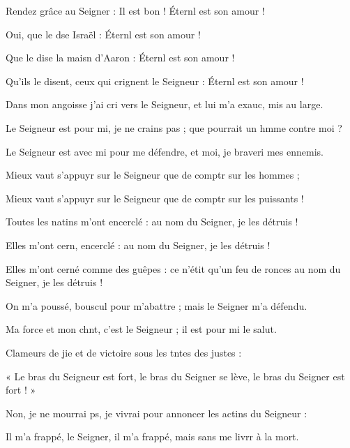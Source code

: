 \item Rendez grâce au Seigner : Il est bon !\psstar{} Éternl est son amour !
\item Oui, que le dse Israël :\psstar{} Éternl est son amour !
\item Que le dise la maisn d’Aaron :\psstar{} Éternl est son amour !
\item Qu’ils le disent, ceux qui crignent le Seigneur :\psstar{} Éternl est son amour !
\item Dans mon angoisse j’ai cri vers le Seigneur,\psstar{} et lui m’a exauc, mis au large.
\item Le Seigneur est pour mi, je ne crains pas ;\psstar{} que pourrait un hmme contre moi ?
\item Le Seigneur est avec mi pour me défendre,\psstar{} et moi, je braveri mes ennemis.
\item Mieux vaut s’appuyr sur le Seigneur\psstar{} que de comptr sur les hommes ;
\item Mieux vaut s’appuyr sur le Seigneur\psstar{} que de comptr sur les puissants !
\item Toutes les natins m’ont encerclé :\psstar{} au nom du Seigner, je les détruis !
\item Elles m’ont cern, encerclé :\psstar{} au nom du Seigner, je les détruis !
\item Elles m’ont cerné comme des guêpes :\pscross{} ce n’étit qu’un feu de ronces\psstar{} au nom du Seigner, je les détruis !
\item On m’a poussé, bouscul pour m’abattre ;\psstar{} mais le Seigner m’a défendu.
\item Ma force et mon chnt, c’est le Seigneur ;\psstar{} il est pour mi le salut.
\item Clameurs de jie et de victoire\psstar{} sous les tntes des justes :
\item « Le bras du Seigneur est fort, le bras du Seigner se lève,\psstar{} le bras du Seigner est fort ! »
\item Non, je ne mourrai ps, je vivrai\psstar{} pour annoncer les actins du Seigneur :
\item Il m’a frappé, le Seigner, il m’a frappé,\psstar{} mais sans me livrr à la mort.
